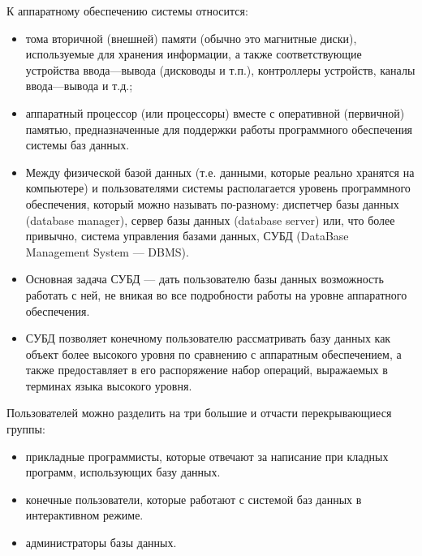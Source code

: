 \documentclass{beamer}
\begin{document}
\begin{frame}
К аппаратному обеспечению системы относится:
\begin{itemize}
\item тома вторичной (внешней) памяти (обычно это магнитные диски), используемые
для хранения информации, а также соответствующие устройства ввода—вывода
(дисководы и т.п.), контроллеры устройств, каналы ввода—вывода и т.д.;
\item аппаратный процессор (или процессоры) вместе с оперативной (первичной) памятью, предназначенные для поддержки работы программного обеспечения системы
баз данных.
\end{itemize}
\end{frame}

\begin{frame}
\begin{itemize}
\item Между физической базой данных (т.е. данными, которые реально хранятся на компьютере) и пользователями системы располагается уровень программного обеспечения, который можно называть по-разному: диспетчер базы данных (database manager), сервер базы данных (database server) или, что более привычно, система управления базами данных, СУБД (DataBase Management System — DBMS).
\item Основная задача СУБД — дать пользователю базы данных возможность работать с ней, не вникая во все подробности работы на уровне аппаратного обеспечения. 
\item СУБД позволяет конечному пользователю рассматривать базу данных как объект более высокого уровня по сравнению с аппаратным обеспечением, а также предоставляет в его распоряжение набор операций, выражаемых в терминах языка высокого уровня.
\end{itemize}
\end{frame}

\begin{frame}
Пользователей можно разделить на три большие и отчасти перекрывающиеся группы:
\begin{itemize}
\item прикладные программисты, которые отвечают за написание при кладных программ, использующих базу данных.
\item конечные пользователи, которые работают с системой баз данных в интерактивном режиме. 
\item  администраторы базы данных.
\end{itemize}
\end{frame}
\end{document}
